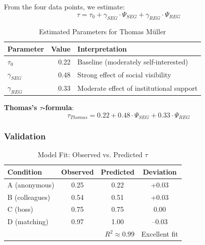 From the four data points, we estimate:
\begin{equation}
\tau = \tau_0 + \gamma_{SEG} \cdot \Psi_{SEG} + \gamma_{REG} \cdot \Psi_{REG}
\end{equation}

\begin{table}[htbp]
\centering
\caption{Estimated Parameters for Thomas Müller}
\label{tab:tau-params}
\begin{tabular}{@{}lrl@{}}
\toprule
\textbf{Parameter} & \textbf{Value} & \textbf{Interpretation} \\
\midrule
$\tau_0$ & 0.22 & Baseline (moderately self-interested) \\
$\gamma_{SEG}$ & 0.48 & Strong effect of social visibility \\
$\gamma_{REG}$ & 0.33 & Moderate effect of institutional support \\
\bottomrule
\end{tabular}
\end{table}

\textbf{Thomas's $\tau$-formula}:
\begin{equation}
\boxed{\tau_{Thomas} = 0.22 + 0.48 \cdot \Psi_{SEG} + 0.33 \cdot \Psi_{REG}}
\end{equation}

\subsubsection{Validation}

\begin{table}[htbp]
\centering
\caption{Model Fit: Observed vs. Predicted $\tau$}
\begin{tabular}{@{}lccc@{}}
\toprule
\textbf{Condition} & \textbf{Observed} & \textbf{Predicted} & \textbf{Deviation} \\
\midrule
A (anonymous) & 0.25 & 0.22 & +0.03 \\
B (colleagues) & 0.54 & 0.51 & +0.03 \\
C (boss) & 0.75 & 0.75 & 0.00 \\
D (matching) & 0.97 & 1.00 & --0.03 \\
\midrule
\multicolumn{3}{r}{$R^2 \approx 0.99$} & Excellent fit \\
\bottomrule
\end{tabular}
\end{table}


